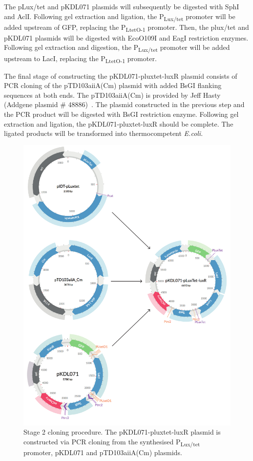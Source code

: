 The pLux/tet and pKDL071 plasmids will subsequently be digested with SphI and AclI. Following gel extraction and ligation, the P\textsubscript{Lux/tet} promoter will be added upstream of GFP, replacing the P\textsubscript{LtetO-1} promoter. Then, the plux/tet and pKDL071 plasmids will be digested with EcoO109I and EagI restriction enzymes. Following gel extraction and digestion, the P\textsubscript{Lux/tet} promoter will be added upstream to LacI, replacing the P\textsubscript{LtetO-1} promoter. 


The final stage of constructing the pKDL071-pluxtet-luxR plasmid consists of PCR cloning of the pTD103aiiA(Cm) plasmid with added BsGI flanking sequences at both ends. The pTD103aiiA(Cm) is provided by Jeff Hasty (Addgene plasmid \# 48886)~\autocite{Prindle:2012cj}. The plasmid constructed in the previous step and the PCR product will be digested with BsGI restriction enzyme. Following gel extraction and ligation, the pKDL071-pluxtet-luxR should be complete. The ligated products will be transformed into thermocompetent \textit{E.coli}.


\begin{figure}[htbp]
	\begin{center}
		\includegraphics[scale=0.6]{../../chapters/chapterDesignSwitches/images/stage2_cloning.pdf}
		\caption[Stage 2 cloning procedure.]{\label{fig:stage2}Stage 2 cloning procedure. The pKDL071-pluxtet-luxR  plasmid is constructed via PCR cloning from the synthesised P\textsubscript{Lux/tet} promoter, pKDL071 and pTD103aiiA(Cm) plasmids.}
	\end{center}
\end{figure}

